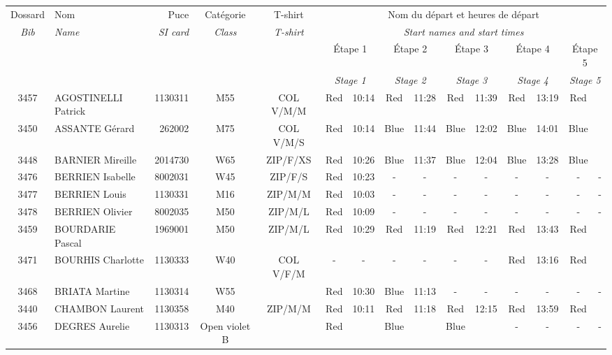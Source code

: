 \documentclass{report}
\begin{document}
  \begin{longtable}{|c|l|r|c|c|*{5}{cc|}}
    Dossard & Nom  & Puce    & Catégorie & T-shirt & \multicolumn{10}{c|}{Nom du départ et heures de départ} \\
    \itshape Bib     & \itshape Name & \itshape SI card & \itshape Class  & \itshape  T-shirt  & \multicolumn{10}{c|}{\itshape Start names and start times} \\
    \hline
    & & & & & \multicolumn{2}{c|}{Étape 1} & \multicolumn{2}{c|}{Étape 2} & \multicolumn{2}{c|}{Étape 3} & \multicolumn{2}{c|}{Étape 4} & \multicolumn{2}{c|}{Étape 5} \\
    & & & & & \multicolumn{2}{c|}{\itshape Stage 1} & \multicolumn{2}{c|}{\itshape Stage 2} & \multicolumn{2}{c|}{\itshape Stage 3} & \multicolumn{2}{c|}{\itshape Stage 4} & \multicolumn{2}{c|}{\itshape Stage 5} \\
    \hline
    3457 & AGOSTINELLI Patrick & 1130311 & M55 & COL V/M/M & Red & 10:14 & Red & 11:28 & Red & 11:39 & Red & 13:19 & Red &  \\
    3450 & ASSANTE Gérard & 262002 & M75 & COL V/M/S & Red & 10:14 & Blue & 11:44 & Blue & 12:02 & Blue & 14:01 & Blue &  \\
    3448 & BARNIER Mireille & 2014730 & W65 & ZIP/F/XS & Red & 10:26 & Blue & 11:37 & Blue & 12:04 & Blue & 13:28 & Blue &  \\
    3476 & BERRIEN Isabelle & 8002031 & W45 & ZIP/F/S & Red & 10:23 & - &  - & - &  - & - &  - & - &  -\\
    3477 & BERRIEN Louis & 1130331 & M16 & ZIP/M/M & Red & 10:03 & - &  - & - &  - & - &  - & - &  -\\
    3478 & BERRIEN Olivier & 8002035 & M50 & ZIP/M/L & Red & 10:09 & - &  - & - &  - & - &  - & - &  -\\
    3459 & BOURDARIE Pascal & 1969001 & M50 & ZIP/M/L & Red & 10:29 & Red & 11:19 & Red & 12:21 & Red & 13:43 & Red &  \\
    3471 & BOURHIS Charlotte & 1130333 & W40 & COL V/F/M & - &  - & - &  - & - &  - & Red & 13:16 & Red &  \\
    3468 & BRIATA Martine & 1130314 & W55 &   & Red & 10:30 & Blue & 11:13 & - &  - & - &  - & - &  -\\
    3440 & CHAMBON Laurent & 1130358 & M40 & ZIP/M/M & Red & 10:11 & Red & 11:18 & Red & 12:15 & Red & 13:59 & Red &  \\
    3456 & DEGRES Aurelie & 1130313 & Open violet B &   & Red &   & Blue &   & Blue &   & - &  - & - &  -\\

\end{longtable}
\end{document}
